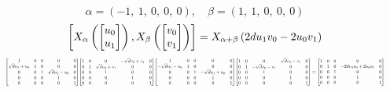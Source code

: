 \documentclass[11pt]{article}
\theoremstyle{definition}
\begin{document}
\[
\alpha = \left( -1, \  1, \  0, \  0, \  0\right), \quad \beta = \left( 1, \  1, \  0, \  0, \  0\right)
\]
\[
\scaletoalign{\textwidth}{\left[ X_{\alpha}\left(\left[\begin{matrix}u_{0}\\u_{1}\end{matrix}\right]\right), X_{\beta}\left(\left[\begin{matrix}v_{0}\\v_{1}\end{matrix}\right]\right) \right] = X_{\alpha + \beta}\left(2 d u_{1} v_{0} - 2 u_{0} v_{1}\right)}
\]
\[
\scaletoalign{\textwidth}{{\left[\begin{matrix}1 & 0 & 0 & 0 & 0\\\sqrt{d} u_{1} + u_{0} & 1 & 0 & 0 & 0\\0 & 0 & 1 & \sqrt{d} u_{1} - u_{0} & 0\\0 & 0 & 0 & 1 & 0\\0 & 0 & 0 & 0 & 1\end{matrix}\right]} {\left[\begin{matrix}1 & 0 & 0 & - \sqrt{d} v_{0} + v_{1} & 0\\0 & 1 & \sqrt{d} v_{0} + v_{1} & 0 & 0\\0 & 0 & 1 & 0 & 0\\0 & 0 & 0 & 1 & 0\\0 & 0 & 0 & 0 & 1\end{matrix}\right]} {\left[\begin{matrix}1 & 0 & 0 & 0 & 0\\- \sqrt{d} u_{1} - u_{0} & 1 & 0 & 0 & 0\\0 & 0 & 1 & - \sqrt{d} u_{1} + u_{0} & 0\\0 & 0 & 0 & 1 & 0\\0 & 0 & 0 & 0 & 1\end{matrix}\right]} {\left[\begin{matrix}1 & 0 & 0 & \sqrt{d} v_{0} - v_{1} & 0\\0 & 1 & - \sqrt{d} v_{0} - v_{1} & 0 & 0\\0 & 0 & 1 & 0 & 0\\0 & 0 & 0 & 1 & 0\\0 & 0 & 0 & 0 & 1\end{matrix}\right]} = {\left[\begin{matrix}1 & 0 & 0 & 0 & 0\\0 & 1 & 0 & - 2 d u_{1} v_{0} + 2 u_{0} v_{1} & 0\\0 & 0 & 1 & 0 & 0\\0 & 0 & 0 & 1 & 0\\0 & 0 & 0 & 0 & 1\end{matrix}\right]}}
\]
\end{document}
